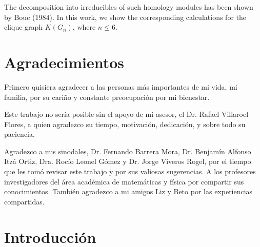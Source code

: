 \documentclass[12pt]{book}
\theoremstyle{definition}
\newcounter{in}
\begin{document}
The decomposition into irreducibles of such homology modules has been shown
by Bouc (1984). In this work, we show the corresponding calculations for
the clique graph $K(G_{n})$, where $n\leq 6$.

\chapter*{Agradecimientos}

Primero quisiera agradecer a las personas más importantes de mi vida,
mi familia, por su cariño y constante preocupación por mi bienestar.

Este trabajo no sería posible sin el apoyo de mi asesor, el
Dr. Rafael Villaroel Flores, a quien agradezco su
tiempo, motivación, dedicación, y sobre todo su paciencia.

Agradezco a mis sinodales, Dr. Fernando Barrera Mora, Dr. Benjamín
Alfonso Itzá Ortiz, Dra. Rocío Leonel Gómez y Dr. Jorge Viveros Rogel,
por el tiempo que les tomó revisar este trabajo y por sus valiosas
sugerencias. A los profesores investigadores del área académica de
matemáticas y física por compartir sus conocimientos. También
agradezco a mi amigos Liz y Beto por las experiencias compartidas.

\tableofcontents

\newpage \thispagestyle{empty}

\chapter*{Introducción}
\end{document}
